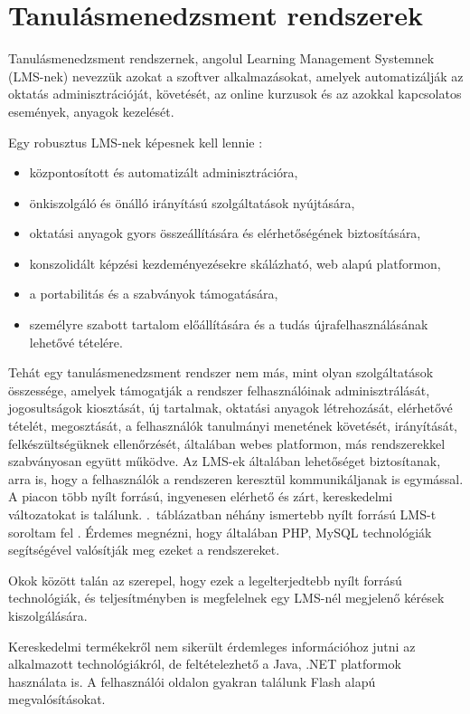 \chapter{Tanulásmenedzsment rendszerek}
Tanulásmenedzsment rendszernek, angolul Learning Management Systemnek (LMS-nek) nevezzük azokat a szoftver alkalmazásokat, amelyek automatizálják az oktatás adminisztrációját, követését, az online kurzusok és az azokkal kapcsolatos események, anyagok kezelését.

Egy robusztus LMS-nek képesnek kell lennie \cite{link:ell}:
\begin{itemize}
\item központosított és automatizált adminisztrációra,
\item önkiszolgáló és önálló irányítású szolgáltatások nyújtására,
\item oktatási anyagok gyors összeállítására és elérhetőségének biztosítására,
\item konszolidált képzési kezdeményezésekre skálázható, web alapú platformon,
\item a portabilitás és a szabványok támogatására,
\item személyre szabott tartalom előállítására és a tudás újrafelhasználásának lehetővé tételére.
\end{itemize}

Tehát egy tanulásmenedzsment rendszer nem más, mint olyan szolgáltatások összessége, amelyek támogatják a rendszer felhasználóinak adminisztrálását, jogosultságok kiosztását, új tartalmak, oktatási anyagok létrehozását, elérhetővé tételét, megosztását, a felhasználók tanulmányi menetének követését, irányítását, felkészültségüknek ellenőrzését, általában webes platformon, más rendszerekkel szabványosan együtt működve. Az LMS-ek általában lehetőséget biztosítanak, arra is, hogy a felhasználók a rendszeren keresztül kommunikáljanak is egymással.
A piacon több nyílt forrású, ingyenesen elérhető és zárt, kereskedelmi változatokat is találunk. .~táblázatban néhány ismertebb nyílt forrású LMS-t soroltam fel \cite{link:lms}. Érdemes megnézni, hogy általában PHP, MySQL technológiák segítségével valósítják meg ezeket a rendszereket.


Okok között talán az szerepel, hogy ezek a legelterjedtebb nyílt forrású technológiák, és teljesítményben is megfelelnek egy LMS-nél megjelenő kérések kiszolgálására. 

Kereskedelmi termékekről nem sikerült érdemleges információhoz jutni az alkalmazott technológiákról, de feltételezhető a Java, .NET platformok használata is. A felhasználói oldalon gyakran találunk Flash alapú megvalósításokat.

